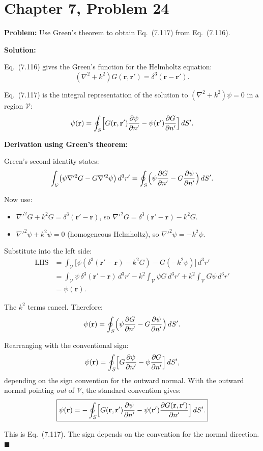 \documentclass[12pt]{article}
\begin{document}
\section*{Chapter 7, Problem 24}

\textbf{Problem:} Use Green's theorem to obtain Eq.\ (7.117) from Eq.\ (7.116).

\bigskip
\textbf{Solution:}

Eq.\ (7.116) gives the Green's function for the Helmholtz equation:
\[
(\nabla^2 + k^2)G(\mathbf{r},\mathbf{r}') = \delta^3(\mathbf{r}-\mathbf{r}').
\]

Eq.\ (7.117) is the integral representation of the solution to $(\nabla^2+k^2)\psi = 0$ in a region $\mathcal{V}$:
\[
\psi(\mathbf{r}) = \oint_S \Bigl[G(\mathbf{r},\mathbf{r}')\frac{\partial\psi}{\partial n'} - \psi(\mathbf{r}')\frac{\partial G}{\partial n'}\Bigr]\,dS'.
\]

\textbf{Derivation using Green's theorem:}

Green's second identity states:
\[
\int_\mathcal{V}\bigl(\psi\nabla'^2 G - G\nabla'^2\psi\bigr)\,d^3r' = \oint_S\Bigl(\psi\frac{\partial G}{\partial n'} - G\frac{\partial\psi}{\partial n'}\Bigr)\,dS'.
\]

Now use:
\begin{itemize}
\item $\nabla'^2 G + k^2 G = \delta^3(\mathbf{r}'-\mathbf{r})$, so $\nabla'^2 G = \delta^3(\mathbf{r}'-\mathbf{r}) - k^2 G$.
\item $\nabla'^2\psi + k^2\psi = 0$ (homogeneous Helmholtz), so $\nabla'^2\psi = -k^2\psi$.
\end{itemize}

Substitute into the left side:
\begin{align}
\text{LHS} &= \int_\mathcal{V}\bigl[\psi(\delta^3(\mathbf{r}'-\mathbf{r}) - k^2 G) - G(-k^2\psi)\bigr]\,d^3r' \\
&= \int_\mathcal{V}\psi\,\delta^3(\mathbf{r}'-\mathbf{r})\,d^3r' - k^2\int_\mathcal{V}\psi G\,d^3r' + k^2\int_\mathcal{V}G\psi\,d^3r' \\
&= \psi(\mathbf{r}).
\end{align}

The $k^2$ terms cancel. Therefore:
\[
\psi(\mathbf{r}) = \oint_S\Bigl(\psi\frac{\partial G}{\partial n'} - G\frac{\partial\psi}{\partial n'}\Bigr)\,dS'.
\]

Rearranging with the conventional sign:
\[
\psi(\mathbf{r}) = \oint_S\Bigl[G\frac{\partial\psi}{\partial n'} - \psi\frac{\partial G}{\partial n'}\Bigr]\,dS',
\]
depending on the sign convention for the outward normal. With the outward normal pointing \textit{out} of $\mathcal{V}$, the standard convention gives:
\[
\boxed{\psi(\mathbf{r}) = -\oint_S\Bigl[G(\mathbf{r},\mathbf{r}')\frac{\partial\psi}{\partial n'} - \psi(\mathbf{r}')\frac{\partial G(\mathbf{r},\mathbf{r}')}{\partial n'}\Bigr]\,dS'.}
\]

This is Eq.\ (7.117). The sign depends on the convention for the normal direction. $\blacksquare$
\end{document}
